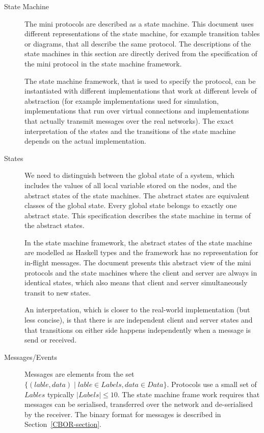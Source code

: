 \documentclass{report}
\theoremstyle{definition}{
  \newtheorem{lemma}{Lemma}[section] %
  \newtheorem{definition}[lemma]{Definition}
}
\theoremstyle{theorem}{
  \newtheorem{invariant}[lemma]{Invariant}
  \newtheorem{proofobligation}[lemma]{Proof Obligation}
}
\numberwithin{equation}{lemma}
\begin{document}
\begin{description}
\item[State Machine]
  The mini protocols are described as a state machine.
  This document uses different representations of the state machine,
  for example transition tables or diagrams, that all describe the same protocol.
  The descriptions of the state machines in this section are directly derived from
  the specification of the mini protocol in the state machine framework.

  The state machine framework, that is used to specify the protocol, can be instantiated
  with different implementations that work at different levels of abstraction
  (for example implementations used for simulation, implementations that run over virtual
  connections and implementations that actually transmit messages over the real networks).
  The exact interpretation of the states and the transitions of the state machine
  depends on the actual implementation.

\item[States]
  We need to distinguish between the global state of a system,
  which includes the values of all local variable stored on the nodes,
  and the abstract states of the state machines.
  The abstract states are equivalent classes of the global state.
  Every global state belongs to exactly one abstract state.
  This specification describes the state machine in terms of the abstract states.

  In the state machine framework, the abstract states of the state machine
  are modelled as Haskell types and the framework has no representation for in-flight messages.
  The document presents this abstract view of the mini protocols and the state machines where the
  client and server are always in identical states,
  which also means that client and server simultaneously transit to new states.

  An interpretation, which is closer to the real-world implementation (but less concise),
  is that there is are independent client and server states
  and that transitions on either side happens independently when a message is send or received.
  
\item[Messages/Events]
  Messages are elements from the set
  $\{(lable, data) \mid lable \in Labels, data \in Data\}$.
  Protocols use a small set of $Lables$ typically $|Labels| \leq 10$.
  The state machine frame work requires that messages can be serialised,
  transferred over the network and de-serialised by the receiver.
  The binary format for messages is described in Section~\ref{CBOR-section}.


\end{description}
\end{document}
